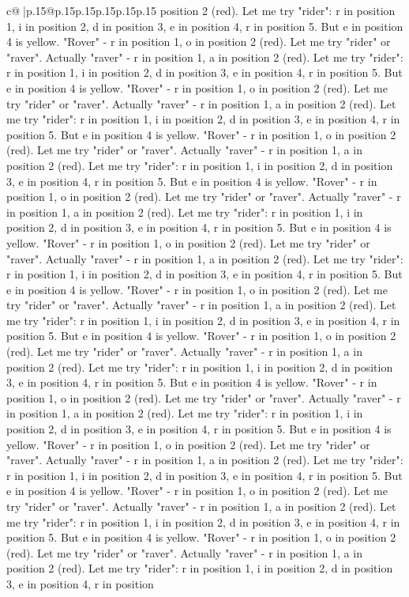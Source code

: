 \documentclass{article}
\begin{document}
{\begin{supertabular}{c@{$\;$}|p{.15\linewidth}@{}p{.15\linewidth}p{.15\linewidth}p{.15\linewidth}p{.15\linewidth}p{.15\linewidth}}
{{{position 2 (red). Let me try "rider": r in position 1, i in position 2, d in position 3, e in position 4, r in position 5. But e in position 4 is yellow. "Rover" {-} r in position 1, o in position 2 (red). Let me try "rider" or "raver". Actually "raver" {-} r in position 1, a in position 2 (red). Let me try "rider": r in position 1, i in position 2, d in position 3, e in position 4, r in position 5. But e in position 4 is yellow. "Rover" {-} r in position 1, o in position 2 (red). Let me try "rider" or "raver". Actually "raver" {-} r in position 1, a in position 2 (red). Let me try "rider": r in position 1, i in position 2, d in position 3, e in position 4, r in position 5. But e in position 4 is yellow. "Rover" {-} r in position 1, o in position 2 (red). Let me try "rider" or "raver". Actually "raver" {-} r in position 1, a in position 2 (red). Let me try "rider": r in position 1, i in position 2, d in position 3, e in position 4, r in position 5. But e in position 4 is yellow. "Rover" {-} r in position 1, o in position 2 (red). Let me try "rider" or "raver". Actually "raver" {-} r in position 1, a in position 2 (red). Let me try "rider": r in position 1, i in position 2, d in position 3, e in position 4, r in position 5. But e in position 4 is yellow. "Rover" {-} r in position 1, o in position 2 (red). Let me try "rider" or "raver". Actually "raver" {-} r in position 1, a in position 2 (red). Let me try "rider": r in position 1, i in position 2, d in position 3, e in position 4, r in position 5. But e in position 4 is yellow. "Rover" {-} r in position 1, o in position 2 (red). Let me try "rider" or "raver". Actually "raver" {-} r in position 1, a in position 2 (red). Let me try "rider": r in position 1, i in position 2, d in position 3, e in position 4, r in position 5. But e in position 4 is yellow. "Rover" {-} r in position 1, o in position 2 (red). Let me try "rider" or "raver". Actually "raver" {-} r in position 1, a in position 2 (red). Let me try "rider": r in position 1, i in position 2, d in position 3, e in position 4, r in position 5. But e in position 4 is yellow. "Rover" {-} r in position 1, o in position 2 (red). Let me try "rider" or "raver". Actually "raver" {-} r in position 1, a in position 2 (red). Let me try "rider": r in position 1, i in position 2, d in position 3, e in position 4, r in position 5. But e in position 4 is yellow. "Rover" {-} r in position 1, o in position 2 (red). Let me try "rider" or "raver". Actually "raver" {-} r in position 1, a in position 2 (red). Let me try "rider": r in position 1, i in position 2, d in position 3, e in position 4, r in position 5. But e in position 4 is yellow. "Rover" {-} r in position 1, o in position 2 (red). Let me try "rider" or "raver". Actually "raver" {-} r in position 1, a in position 2 (red). Let me try "rider": r in position 1, i in position 2, d in position 3, e in position 4, r in position 5. But e in position 4 is yellow. "Rover" {-} r in position 1, o in position 2 (red). Let me try "rider" or "raver". Actually "raver" {-} r in position 1, a in position 2 (red). Let me try "rider": r in position 1, i in position 2, d in position 3, e in position 4, r in position }}}
\end{supertabular}}
\end{document}

